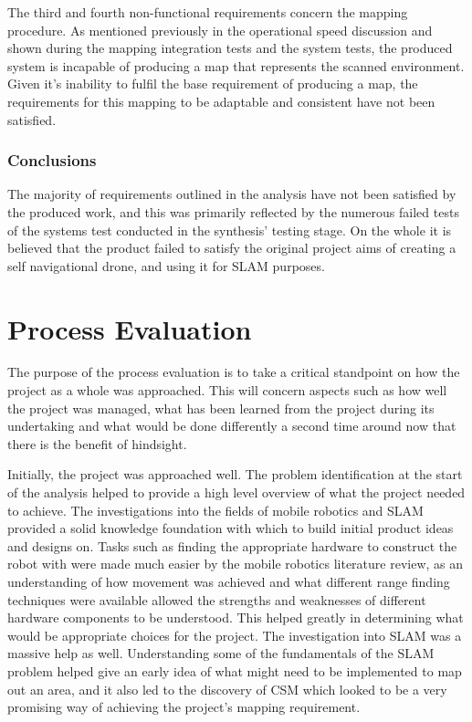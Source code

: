 		The third and fourth non-functional requirements concern the mapping procedure. As mentioned previously in the operational speed discussion and shown during the mapping integration tests and the system tests, the produced system is incapable of producing a map that represents the scanned environment. Given it's inability to fulfil the base requirement of producing a map, the requirements for this mapping to be adaptable and consistent have not been satisfied.
	
		\subsection{Conclusions}
		The majority of requirements outlined in the analysis have not been satisfied by the produced work, and this was primarily reflected by the numerous failed tests of the systems test conducted in the synthesis' testing stage. On the whole it is believed that the product failed to satisfy the original project aims of creating a self navigational drone, and using it for SLAM purposes. 
	
	\chapter{Process Evaluation}
	\label{evaluation:processevaluation}
		
		
		
	The purpose of the process evaluation is to take a critical standpoint on how the project as a whole was approached. This will concern aspects such as how well the project was managed, what has been learned from the project during its undertaking and what would be done differently a second time around now that there is the benefit of hindsight.
	
	Initially, the project was approached well. The problem identification at the start of the analysis helped to provide a high level overview of what the project needed to achieve. The investigations into the fields of mobile robotics and SLAM provided a solid knowledge foundation with which to build initial product ideas and designs on. Tasks such as finding the appropriate hardware to construct the robot with were made much easier by the mobile robotics literature review, as an understanding of how movement was achieved and what different range finding techniques were available allowed the strengths and weaknesses of different hardware components to be understood. This helped greatly in determining what would be appropriate choices for the project. The investigation into SLAM was a massive help as well. Understanding some of the fundamentals of the SLAM problem helped give an early idea of what might need to be implemented to map out an area, and it also led to the discovery of CSM which looked to be a very promising way of achieving the project's mapping requirement.
	
